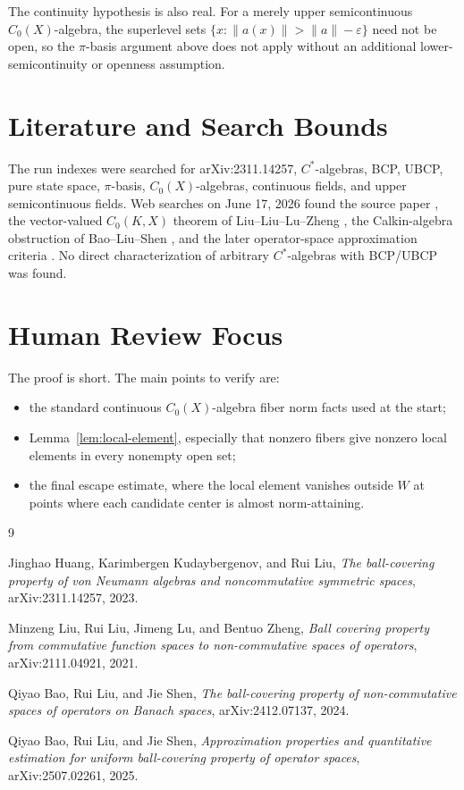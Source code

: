 \documentclass[11pt]{article}
\begin{document}
The continuity hypothesis is also real.  For a merely upper semicontinuous
\(C_0(X)\)-algebra, the superlevel sets
\(\{x:\|a(x)\|>\|a\|-\varepsilon\}\) need not be open, so the \(\pi\)-basis
argument above does not apply without an additional lower-semicontinuity or
openness assumption.

\section*{Literature and Search Bounds}

The run indexes were searched for arXiv:2311.14257, \(C^*\)-algebras, BCP,
UBCP, pure state space, \(\pi\)-basis, \(C_0(X)\)-algebras, continuous fields,
and upper semicontinuous fields.  Web searches on June 17, 2026 found the
source paper \cite{HKL}, the vector-valued \(C_0(K,X)\) theorem of
Liu--Liu--Lu--Zheng \cite{LLLZ}, the Calkin-algebra obstruction of
Bao--Liu--Shen \cite{BLS}, and the later operator-space approximation
criteria \cite{BLS2}.  No direct characterization of arbitrary \(C^*\)-algebras
with BCP/UBCP was found.

\section*{Human Review Focus}

The proof is short.  The main points to verify are:
\begin{itemize}
    \item the standard continuous \(C_0(X)\)-algebra fiber norm facts used at
    the start;
    \item Lemma~\ref{lem:local-element}, especially that nonzero fibers give
    nonzero local elements in every nonempty open set;
    \item the final escape estimate, where the local element vanishes outside
    \(W\) at points where each candidate center is almost norm-attaining.
\end{itemize}

\begin{thebibliography}{9}

Jinghao Huang, Karimbergen Kudaybergenov, and Rui Liu,
\emph{The ball-covering property of von Neumann algebras and noncommutative
symmetric spaces},
arXiv:2311.14257, 2023.

Minzeng Liu, Rui Liu, Jimeng Lu, and Bentuo Zheng,
\emph{Ball covering property from commutative function spaces to
non-commutative spaces of operators},
arXiv:2111.04921, 2021.

Qiyao Bao, Rui Liu, and Jie Shen,
\emph{The ball-covering property of non-commutative spaces of operators on
Banach spaces},
arXiv:2412.07137, 2024.

Qiyao Bao, Rui Liu, and Jie Shen,
\emph{Approximation properties and quantitative estimation for uniform
ball-covering property of operator spaces},
arXiv:2507.02261, 2025.

\end{thebibliography}
\end{document}
